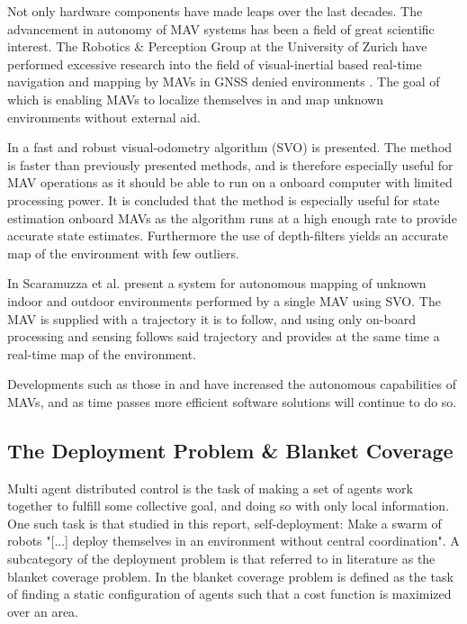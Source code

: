 Not only hardware components have made leaps over the last decades. The advancement in autonomy of MAV systems has been a field of great scientific interest.
The Robotics \& Perception Group at the University of Zurich have performed excessive research into the field of visual-inertial based real-time navigation and mapping
by MAVs in GNSS denied environments \cite{svo2, svo1}. The goal of which is enabling MAVs to localize themselves in and map unknown environments without external aid.

In \cite{svo2} a fast and robust visual-odometry algorithm (SVO) is presented. The method is faster than previously presented methods, and is therefore especially useful 
for MAV operations as it should be able to run on a onboard computer with limited processing power. It is concluded that the method is especially useful for state estimation onboard MAVs as the algorithm runs
at a high enough rate to provide accurate state estimates. Furthermore the use of depth-filters yields an accurate map of the environment with few outliers.

In \cite{svo1} Scaramuzza et al. present a system for autonomous mapping of unknown indoor and outdoor environments performed by a single MAV using SVO. The MAV is supplied with 
a trajectory it is to follow, and using only on-board processing and sensing follows said trajectory and provides at the same time a real-time map of the environment.

Developments such as those in \cite{svo1} and \cite{svo2} have increased the autonomous capabilities of MAVs, and as time passes more efficient software solutions will continue to do so.

\subsection{The Deployment Problem \& Blanket Coverage}
Multi agent distributed control is the task of making a set of agents work together to fulfill some collective goal, and doing so 
with only local information. One such task is that studied in this report, self-deployment: Make a swarm of robots "[...] deploy 
themselves in an environment without central coordination"\cite{BAYINDIR2016292}. A subcategory of the deployment problem is that referred to 
in literature as the blanket coverage problem. In \cite{BAYINDIR2016292} the blanket coverage problem is defined as the task of finding a static 
configuration of agents such that a cost function is maximized over an area.

